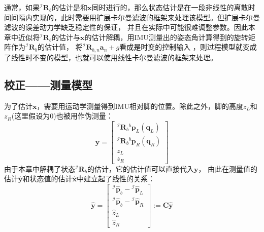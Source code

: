 通常，如果${ }^{\mathcal{I}} \boldsymbol{R}_{b}$的估计是和$\boldsymbol{x}$同时进行的，那么状态估计是在一段非线性的离散时间间隔内实现的，此时需要用扩展卡尔曼滤波的框架来处理该模型。但扩展卡尔曼滤波的误差动力学缺乏稳定性的保证，
并且在实际中可能很难调整参数。因此本章中近似将${ }^{\mathcal{I}} \boldsymbol{R}_{b}$的估计与$\boldsymbol{x}$的估计解耦，用IMU测量出的姿态角计算得到的旋转矩阵作为${ }^{\mathcal{I}} \boldsymbol{R}_{b}$的估计值，
将${ }^{\mathcal{I}} \boldsymbol{R}_{b, n} \boldsymbol{a}_n+g$看成是时变的控制输入 ，则过程模型就变成了线性时不变的模型，也就可以使用线性卡尔曼滤波的框架来处理。

\subsection{校正——测量模型}

为了估计$\boldsymbol{x}$，需要用运动学测量得到IMU相对脚的位置。除此之外，脚的高度$z_L$和$z_R$(这里假设为0)也被用作伪测量：
\begin{equation}
    \label{equ:est_posvel_mea}
    \boldsymbol{y}=\left[\begin{array}{c}
        { }^{\mathcal{I}} \boldsymbol{R}_b{ }^b \boldsymbol{p}_L\left(\boldsymbol{q}_L\right) \\
        { }^{\mathcal{I}} \boldsymbol{R}_b{ }^b \boldsymbol{p}_R\left(\boldsymbol{q}_R\right) \\
        z_L \\
        z_R
        \end{array}\right]
\end{equation}
由于本章中解耦了状态${ }^{\mathcal{I}} \boldsymbol{R}_{b}$的估计，它的估计值可以直接代入$\boldsymbol{y}$，
由此在测量值的估计$\hat{\boldsymbol{y}}$和状态值的估计$\hat{\boldsymbol{x}}$中建立起了线性的关系：
\begin{equation}
    \label{equ:est_mea_model}
    \hat{\boldsymbol{y}}=\left[\begin{array}{c}
        { }^{\mathcal{I}} \hat{\boldsymbol{p}}_b-{ }^{\mathcal{I}} \hat{\boldsymbol{p}}_L \\
        { }^{\mathcal{I}} \hat{\boldsymbol{p}}_b-{ }^{\mathcal{I}} \hat{\boldsymbol{p}}_R \\
        \hat{z}_L \\
        \hat{z}_R
        \end{array}\right]:=\boldsymbol{C} \hat{\boldsymbol{y}}
\end{equation}

